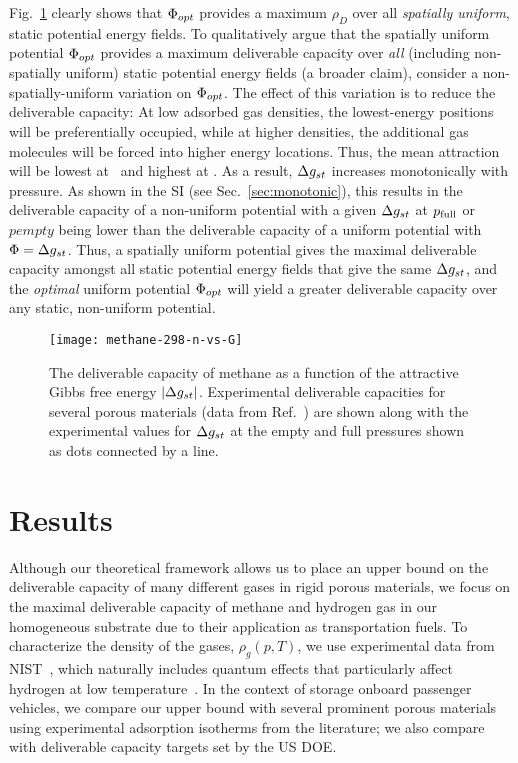 Fig.~\ref{fig:methane-298-D} clearly shows that $\Phi_{opt}$ provides a maximum
$\rho_D$ over all \emph{spatially uniform}, static potential energy fields. To
qualitatively argue that the spatially uniform potential $\Phi_{opt}$ provides a
maximum deliverable capacity over \emph{all} (including non-spatially uniform)
static potential energy fields (a broader claim), consider a
non-spatially-uniform variation on $\Phi_{opt}$. The effect of
this variation is to reduce the deliverable capacity: At low adsorbed gas
densities, the lowest-energy positions will be preferentially occupied, while
at higher densities, the additional gas molecules will be forced into higher
energy locations. Thus, the mean attraction will be lowest at \pfull\ and
highest at \pempty. As a result, $\Delta g_{st}$ increases monotonically with
pressure. As shown in the SI (see Sec.~\ref{sec:monotonic}), this results in
the deliverable capacity of a non-uniform potential with a given $\Delta g_{st}$ at $p_{\text{full}}$ or $pempty$ being lower than the
deliverable capacity of a uniform potential with $\Phi=\Delta g_{st}$. Thus, a spatially uniform potential gives the maximal
deliverable capacity amongst all static potential energy fields that give the
same $\Delta g_{st}$, and the \emph{optimal} uniform potential $\Phi_{opt}$ will yield a
greater deliverable capacity over any static, non-uniform potential.

\begin{figure}
    \centering
    \texttt{[image: methane-298-n-vs-G]}
    \caption{The deliverable capacity of methane as a function of the attractive Gibbs free energy $|\Delta g_{st}|$.
    Experimental deliverable capacities for several porous materials (data from Ref.~\cite{mason2014evaluating, furukawa2009storage}) are shown along with the experimental values for $\Delta g_{st}$ at the empty and full pressures shown as dots connected by a line.}
    \label{fig:methane-298-D}
\end{figure}

\section{Results}
Although our theoretical framework allows us to place an upper bound on the
deliverable capacity of many different gases in rigid porous materials, we
focus on the maximal deliverable capacity of methane and hydrogen gas in our
homogeneous substrate due to their application as transportation fuels. To
characterize the density of the gases, $\rho_g(p, T)$, we use experimental data
from NIST~\cite{nist}, which naturally includes quantum effects that
particularly affect hydrogen at low temperature~\cite{kumar2006quantum}. In the
context of storage onboard passenger vehicles, we compare our upper bound with
several prominent porous materials using experimental adsorption isotherms from
the literature; we also compare with deliverable capacity targets set by the US
DOE.

